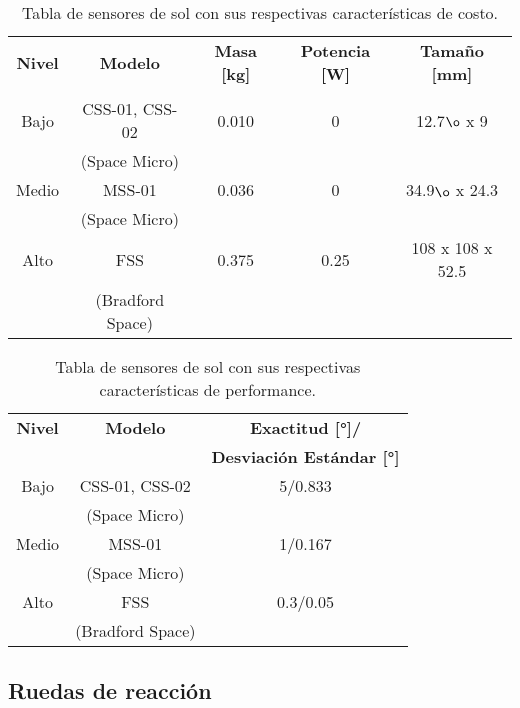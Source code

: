 \begin{table}[H]
	\centering
	\caption{Tabla de sensores de sol con sus respectivas características de costo.}
	\begin{tabular}{|c|c|c|c|c|}
		\hline
		\textbf{Nivel} & \textbf{Modelo} & \textbf{Masa [kg]} & \textbf{Potencia [W]} & \textbf{Tamaño [mm]}  \\
		& &  &  &   \\ \hline
		Bajo & CSS-01, CSS-02  & 0.010  & 0 & 12.7$\o$ x 9 \\
		& (Space Micro) &  &  &  \\ \hline
		Medio & MSS-01 & 0.036 & 0 &  34.9$\o$ x 24.3  \\
		& (Space Micro) & &  &  \\ \hline
		Alto & FSS & 0.375 & 0.25 & 108 x 108 x 52.5  \\
		& (Bradford Space) & &  &   \\ \hline
	\end{tabular}
	
\end{table}

\begin{table}[H]
	\centering
	\caption{Tabla de sensores de sol con sus respectivas características de performance.}
	\begin{tabular}{|c|c|c|}
		\hline
		\textbf{Nivel} & \textbf{Modelo} & \textbf{Exactitud [°]/}  \\
		& & \textbf{Desviación Estándar [°]}   \\ \hline
		Bajo & CSS-01, CSS-02 & 5/0.833  \\
		& (Space Micro) &   \\ \hline
		Medio & MSS-01 & 1/0.167  \\
		& (Space Micro) &   \\ \hline
		Alto & FSS & 0.3/0.05   \\
		& (Bradford Space) &    \\ \hline
	\end{tabular}
	
\end{table}

\subsection{Ruedas de reacción}


